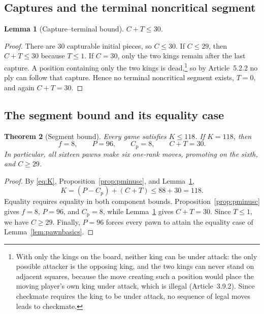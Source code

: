 \documentclass[11pt]{article}
\newtheorem{theorem}{Theorem}[section]
\newtheorem{lemma}[theorem]{Lemma}
\theoremstyle{definition}
\begin{document}
\subsection{Captures and the terminal noncritical segment}

\begin{lemma}[Capture--terminal bound]\label{lem:ct30}
$C+T\le30$.
\end{lemma}

\begin{proof}
There are $30$ capturable initial pieces, so $C\le30$. If $C\le29$, then
$C+T\le30$ because $T\le1$. If $C=30$, only the two kings remain after the
last capture. A position containing only the two kings is
dead,\footnote{With only the kings on the board, neither king can be
under attack: the only possible attacker is the opposing king, and the two kings
can never stand on adjacent squares, because the move creating such a
position would place the moving player's own king under attack, which is
illegal (Article~3.9.2). Since checkmate requires the king to be under
attack, no sequence of legal moves leads to checkmate.} so by
Article~5.2.2 no ply can follow that capture. Hence no terminal
noncritical segment exists, $T=0$, and again $C+T=30$.
\end{proof}

\subsection{The segment bound and its equality case}

\begin{theorem}[Segment bound]\label{thm:k118}
Every game satisfies $K\le118$. If $K=118$, then
\begin{equation}\label{eq:equalityprofile}
  f=8,\qquad P=96,\qquad C_{\mathrm p}=8,\qquad C+T=30.
\end{equation}
In particular, all sixteen pawns make six one-rank moves, promoting on the
sixth, and $C\ge29$.
\end{theorem}

\begin{proof}
By \eqref{eq:K}, Proposition~\ref{prop:pminusc}, and Lemma~\ref{lem:ct30},
\[
  K=(P-C_{\mathrm p})+(C+T)\le88+30=118.
\]
Equality requires equality in both component bounds.
Proposition~\ref{prop:pminusc} gives $f=8$, $P=96$, and
$C_{\mathrm p}=8$, while Lemma~\ref{lem:ct30} gives $C+T=30$. Since
$T\le1$, we have $C\ge29$. Finally, $P=96$ forces every pawn to attain the
equality case of Lemma~\ref{lem:pawnbasics}.
\end{proof}
\end{document}
